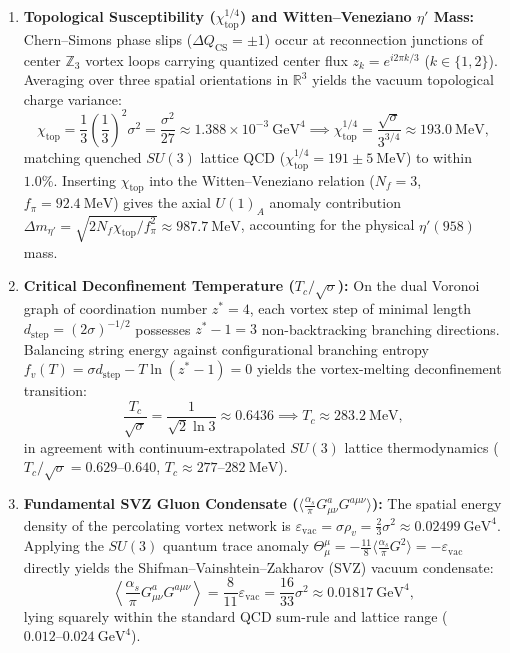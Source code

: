 \documentclass[11pt, a4paper]{article}
\theoremstyle{definition}
\theoremstyle{remark}
\begin{document}
\begin{enumerate}
  \item \textbf{Topological Susceptibility ($\chi_{\mathrm{top}}^{1/4}$) and Witten--Veneziano $\eta'$ Mass:}
  Chern--Simons phase slips ($\Delta Q_{\mathrm{CS}} = \pm 1$) occur at reconnection junctions of center $\mathbb{Z}_{3}$ vortex loops carrying quantized center flux $z_{k} = e^{i2\pi k/3}$ ($k \in \{1, 2\}$). Averaging over three spatial orientations in $\mathbb{R}^{3}$ yields the vacuum topological charge variance:
  \begin{equation}
    \chi_{\mathrm{top}} = \frac{1}{3}\left(\frac{1}{3}\right)^{2}\sigma^{2} = \frac{\sigma^{2}}{27} \approx 1.388 \times 10^{-3}~\mathrm{GeV}^{4} \implies \chi_{\mathrm{top}}^{1/4} = \frac{\sqrt{\sigma}}{3^{3/4}} \approx 193.0~\mathrm{MeV},
  \end{equation}
  matching quenched $SU(3)$ lattice QCD ($\chi_{\mathrm{top}}^{1/4} = 191 \pm 5~\mathrm{MeV}$) to within $1.0\%$. Inserting $\chi_{\mathrm{top}}$ into the Witten--Veneziano relation ($N_{f} = 3$, $f_{\pi} = 92.4~\mathrm{MeV}$) gives the axial $U(1)_{A}$ anomaly contribution $\Delta m_{\eta'} = \sqrt{2N_{f}\chi_{\mathrm{top}}/f_{\pi}^{2}} \approx 987.7~\mathrm{MeV}$, accounting for the physical $\eta'(958)$ mass.

  \item \textbf{Critical Deconfinement Temperature ($T_{c}/\sqrt{\sigma}$):}
  On the dual Voronoi graph of coordination number $z^{*} = 4$, each vortex step of minimal length $d_{\mathrm{step}} = (2\sigma)^{-1/2}$ possesses $z^{*} - 1 = 3$ non-backtracking branching directions. Balancing string energy against configurational branching entropy $f_{v}(T) = \sigma d_{\mathrm{step}} - T\ln(z^{*} - 1) = 0$ yields the vortex-melting deconfinement transition:
  \begin{equation}
    \frac{T_{c}}{\sqrt{\sigma}} = \frac{1}{\sqrt{2}\ln 3} \approx 0.6436 \implies T_{c} \approx 283.2~\mathrm{MeV},
  \end{equation}
  in agreement with continuum-extrapolated $SU(3)$ lattice thermodynamics ($T_{c}/\sqrt{\sigma} = 0.629\text{--}0.640$, $T_{c} \approx 277\text{–}282~\mathrm{MeV}$).

  \item \textbf{Fundamental SVZ Gluon Condensate ($\langle \frac{\alpha_{s}}{\pi}G_{\mu\nu}^{a}G^{a\mu\nu}\rangle$):}
  The spatial energy density of the percolating vortex network is $\varepsilon_{\mathrm{vac}} = \sigma\rho_{v} = \frac{2}{3}\sigma^{2} \approx 0.02499~\mathrm{GeV}^{4}$. Applying the $SU(3)$ quantum trace anomaly $\Theta^{\mu}_{\mu} = -\frac{11}{8}\langle \frac{\alpha_{s}}{\pi}G^{2}\rangle = -\varepsilon_{\mathrm{vac}}$ directly yields the Shifman--Vainshtein--Zakharov (SVZ) vacuum condensate:
  \begin{equation}
    \left\langle \frac{\alpha_{s}}{\pi}G_{\mu\nu}^{a}G^{a\mu\nu} \right\rangle = \frac{8}{11}\varepsilon_{\mathrm{vac}} = \frac{16}{33}\sigma^{2} \approx 0.01817~\mathrm{GeV}^{4},
  \end{equation}
  lying squarely within the standard QCD sum-rule and lattice range ($0.012\text{--}0.024~\mathrm{GeV}^{4}$).


\end{enumerate}
\end{document}
